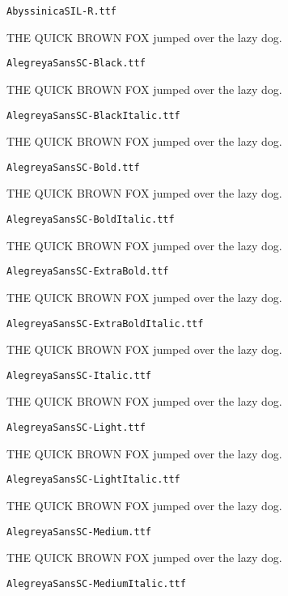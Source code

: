 \documentclass{article}
\begin{document}
\setmainfont[Extension=.ttf]{AbyssinicaSIL-R}
\noindent \verb!AbyssinicaSIL-R.ttf!

THE QUICK BROWN FOX jumped over the lazy dog.

\setmainfont[Extension=.ttf]{AlegreyaSansSC-Black}
\noindent \verb!AlegreyaSansSC-Black.ttf!

THE QUICK BROWN FOX jumped over the lazy dog.

\setmainfont[Extension=.ttf]{AlegreyaSansSC-BlackItalic}
\noindent \verb!AlegreyaSansSC-BlackItalic.ttf!

THE QUICK BROWN FOX jumped over the lazy dog.

\setmainfont[Extension=.ttf]{AlegreyaSansSC-Bold}
\noindent \verb!AlegreyaSansSC-Bold.ttf!

THE QUICK BROWN FOX jumped over the lazy dog.

\setmainfont[Extension=.ttf]{AlegreyaSansSC-BoldItalic}
\noindent \verb!AlegreyaSansSC-BoldItalic.ttf!

THE QUICK BROWN FOX jumped over the lazy dog.

\setmainfont[Extension=.ttf]{AlegreyaSansSC-ExtraBold}
\noindent \verb!AlegreyaSansSC-ExtraBold.ttf!

THE QUICK BROWN FOX jumped over the lazy dog.

\setmainfont[Extension=.ttf]{AlegreyaSansSC-ExtraBoldItalic}
\noindent \verb!AlegreyaSansSC-ExtraBoldItalic.ttf!

THE QUICK BROWN FOX jumped over the lazy dog.

\setmainfont[Extension=.ttf]{AlegreyaSansSC-Italic}
\noindent \verb!AlegreyaSansSC-Italic.ttf!

THE QUICK BROWN FOX jumped over the lazy dog.

\setmainfont[Extension=.ttf]{AlegreyaSansSC-Light}
\noindent \verb!AlegreyaSansSC-Light.ttf!

THE QUICK BROWN FOX jumped over the lazy dog.

\setmainfont[Extension=.ttf]{AlegreyaSansSC-LightItalic}
\noindent \verb!AlegreyaSansSC-LightItalic.ttf!

THE QUICK BROWN FOX jumped over the lazy dog.

\setmainfont[Extension=.ttf]{AlegreyaSansSC-Medium}
\noindent \verb!AlegreyaSansSC-Medium.ttf!

THE QUICK BROWN FOX jumped over the lazy dog.

\setmainfont[Extension=.ttf]{AlegreyaSansSC-MediumItalic}
\noindent \verb!AlegreyaSansSC-MediumItalic.ttf!
\end{document}
